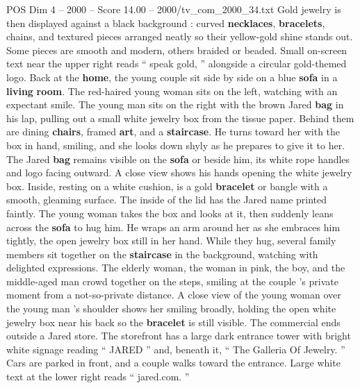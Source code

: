 \begin{textsample}{POS Dim 4 – 2000 – Score 14.00 – 2000/tv\_com\_2000\_34.txt}
Gold jewelry is then displayed against a black background : curved \textbf{necklaces}, \textbf{bracelets}, chains, and textured pieces arranged neatly so their yellow-gold shine stands out.
Some pieces are smooth and modern, others braided or beaded.
Small on-screen text near the upper right reads “ speak gold, ” alongside a circular gold-themed logo.
Back at the \textbf{home}, the young couple sit side by side on a blue \textbf{sofa} in a \textbf{living} \textbf{room}.
The red-haired young woman sits on the left, watching with an expectant smile.
The young man sits on the right with the brown Jared \textbf{bag} in his lap, pulling out a small white jewelry box from the tissue paper.
Behind them are dining \textbf{chairs}, framed \textbf{art}, and a \textbf{staircase}.
He turns toward her with the box in hand, smiling, and she looks down shyly as he prepares to give it to her.
The Jared \textbf{bag} remains visible on the \textbf{sofa} or beside him, its white rope handles and logo facing outward.
A close view shows his hands opening the white jewelry box.
Inside, resting on a white cushion, is a gold \textbf{bracelet} or bangle with a smooth, gleaming surface.
The inside of the lid has the Jared name printed faintly.
The young woman takes the box and looks at it, then suddenly leans across the \textbf{sofa} to hug him.
He wraps an arm around her as she embraces him tightly, the open jewelry box still in her hand.
While they hug, several family members sit together on the \textbf{staircase} in the background, watching with delighted expressions.
The elderly woman, the woman in pink, the boy, and the middle-aged man crowd together on the steps, smiling at the couple ’s private moment from a not-so-private distance.
A close view of the young woman over the young man ’s shoulder shows her smiling broadly, holding the open white jewelry box near his back so the \textbf{bracelet} is still visible.
The commercial ends outside a Jared store.
The storefront has a large dark entrance tower with bright white signage reading “ JARED ” and, beneath it, “ The Galleria Of Jewelry. ” Cars are parked in front, and a couple walks toward the entrance.
Large white text at the lower right reads “ jared.com. ”

\end{textsample}
